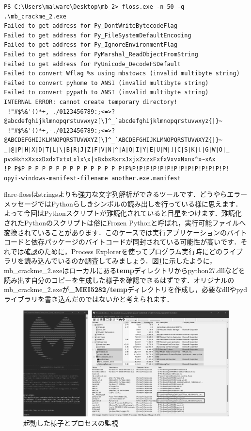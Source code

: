 \begin{tcolorbox}[title=文字列の抽出, sharp corners, left=2mm]\scriptsize
\begin{verbatim}
PS C:\Users\malware\Desktop\mb_2> floss.exe -n 50 -q .\mb_crackme_2.exe
Failed to get address for Py_DontWriteBytecodeFlag
Failed to get address for Py_FileSystemDefaultEncoding
Failed to get address for Py_IgnoreEnvironmentFlag
Failed to get address for PyMarshal_ReadObjectFromString
Failed to get address for PyUnicode_DecodeFSDefault
Failed to convert Wflag %s using mbstowcs (invalid multibyte string)
Failed to convert pyhome to ANSI (invalid multibyte string)
Failed to convert pypath to ANSI (invalid multibyte string)
INTERNAL ERROR: cannot create temporary directory!
 !"#$%&'()*+,-./0123456789:;<=>?@abcdefghijklmnopqrstuvwxyz[\]^_`abcdefghijklmnopqrstuvwxyz{|}~
 !"#$%&'()*+,-./0123456789:;<=>?@ABCDEFGHIJKLMNOPQRSTUVWXYZ[\]^_`ABCDEFGHIJKLMNOPQRSTUVWXYZ{|}~
_|@|P|H|X|D|T|L|\|B|R|J|Z|F|V|N|^|A|Q|I|Y|E|U|M|]|C|S|K|[|G|W|O|_
pvxHxhxXxxxDxdxTxtxLxlx\x|xBxbxRxrxJxjxZxzxFxfxVxvxNxnx^x~xAx
!P P$P P P P P P P P P P P P P P P!P%P!P!P!P!P!P!P!P!P!P!P!P!P!P!
opyi-windows-manifest-filename another.exe.manifest
\end{verbatim}
\end{tcolorbox}
flare-flossはstringsよりも強力な文字列解析ができるツールです．どうやらエラーメッセージではPythonらしきシンボルの読み出しを行っている様に思えます．よって今回はPythonスクリプトが難読化されていると目星をつけます．難読化されたPythonのスクリプトは俗にFrozen Pythonと呼ばれ，実行可能ファイルへ変換されていることがあります．このケースでは実行アプリケーションのバイトコードと依存パッケージのバイトコードが同封されている可能性が高いです．それでは確認のために，Process Explorerを使ってプログラム実行時にどのライブラリを読み込んでいるのか調査してみましょう．図\ref{fig:crackme_detail}に示したように，mb\_crackme\_2.exeはローカルにある\textbf{temp}ディレクトリからpython27.dllなどを読み出す自分のコピーを生成した様子を確認できるはずです．オリジナルのmb\_crackme\_2.exeが\textbf{\_MEI5282/temp}ディレクトリを作成し，必要なdllやpydライブラリを書き込んだのではないかと考えられます．
\begin{figure}[H]
    \centering
    \includegraphics[width=\linewidth]{./assets/takuzoo3868asset/proc_gray.png}
    \caption{起動した様子とプロセスの監視}
    \label{fig:crackme_detail}
\end{figure}
